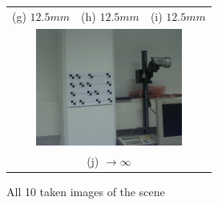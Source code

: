 \documentclass[
a4paper,     %
12pt         %
]{scrartcl}  %
\begin{document}
\begin{figure}[ht!]
\begin{tabular}{ccc}
(g) $12.5mm$ & (h) $12.5mm$ & (i) $12.5mm$\\[6pt]
 \multicolumn{3}{c}{\includegraphics[width=48mm]{./Bildg_Messtechnik_Lab/CrossRatio/images/image_b5.png}} \\[6pt]
 \multicolumn{3}{c}{(j) $\rightarrow\infty$}
\end{tabular}
\caption{All 10 taken images of the scene}
\label{fig:cornermark_images}
\end{figure}



% 

% 
\end{document}
